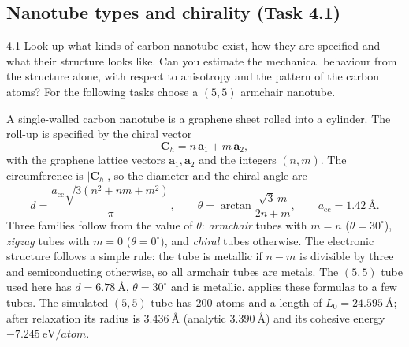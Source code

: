 \documentclass[11pt,a4paper]{article}
\numberwithin{equation}{section}
\theoremstyle{remark}
\begin{document}
\subsection{Nanotube types and chirality (Task 4.1)}\label{sec:cnttypes}

\begin{task}{4.1}
  Look up what kinds of carbon nanotube exist, how they are specified and what their structure looks
  like. Can you estimate the mechanical behaviour from the structure alone, with respect to anisotropy
  and the pattern of the carbon atoms? For the following tasks choose a $(5,5)$ armchair nanotube.
\end{task}

A single-walled carbon nanotube is a graphene sheet rolled into a cylinder. The roll-up is specified
by the chiral vector
\begin{equation}\label{eq:chiral}
  \bm{C}_h = n\,\bm{a}_1 + m\,\bm{a}_2,
\end{equation}
with the graphene lattice vectors $\bm{a}_1, \bm{a}_2$ and the integers $(n,m)$. The circumference is
$|\bm{C}_h|$, so the diameter and the chiral angle are
\begin{equation}\label{eq:diameter}
  d = \frac{a_{\mathrm{cc}}\sqrt{3\left(n^2+nm+m^2\right)}}{\pi},
  \qquad
  \theta = \arctan\frac{\sqrt3\,m}{2n+m},
  \qquad a_{\mathrm{cc}} = \SI{1.42}{\angstrom}.
\end{equation}
Three families follow from the value of $\theta$: \emph{armchair} tubes with $m = n$
($\theta = 30^\circ$), \emph{zigzag} tubes with $m = 0$ ($\theta = 0^\circ$), and \emph{chiral} tubes
otherwise. The electronic structure follows a simple rule: the tube is metallic if $n-m$ is divisible
by three and semiconducting otherwise, so all armchair tubes are metals. The $(5,5)$ tube used here has
$d = \SI{6.78}{\angstrom}$, $\theta = 30^\circ$ and is metallic.  applies these
formulas to a few tubes. The simulated $(5,5)$ tube has 200 atoms and a length of
$L_0 = \SI{24.595}{\angstrom}$; after relaxation its radius is $\SI{3.436}{\angstrom}$ (analytic
$\SI{3.390}{\angstrom}$) and its cohesive energy $\SI{-7.245}{\electronvolt\per atom}$.
\end{document}
